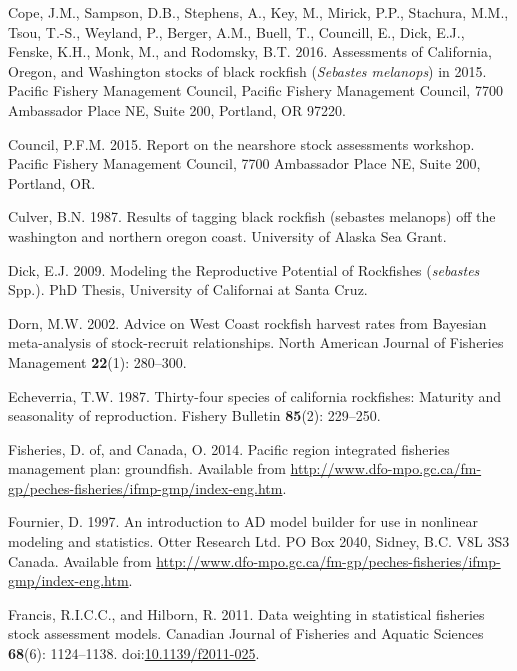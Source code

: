 \documentclass[11pt,
  english,
  letterpaper,
]{article}
\newlength{\cslhangindent}
\newenvironment{CSLReferences}[2] %
 {%
  \setlength{\parindent}{0pt}
  \ifodd #1 \everypar{\setlength{\hangindent}{\cslhangindent}}\ignorespaces\fi
  \ifnum #2 > 0
  \setlength{\parskip}{#2\baselineskip}
  \fi
 }%
 {}
\begin{document}
\begin{CSLReferences}{1}{0}
\leavevmode{}%
Cope, J.M., Sampson, D.B., Stephens, A., Key, M., Mirick, P.P., Stachura, M.M., Tsou, T.-S., Weyland, P., Berger, A.M., Buell, T., Councill, E., Dick, E.J., Fenske, K.H., Monk, M., and Rodomsky, B.T. 2016. Assessments of {California}, {Oregon}, and {Washington} stocks of black rockfish (\emph{{Sebastes} melanops}) in 2015. Pacific Fishery Management Council, Pacific Fishery Management Council, 7700 Ambassador Place NE, Suite 200, Portland, OR 97220.

\leavevmode{}%
Council, P.F.M. 2015. Report on the nearshore stock assessments workshop. Pacific Fishery Management Council, 7700 Ambassador Place NE, Suite 200, Portland, OR.

\leavevmode{}%
Culver, B.N. 1987. Results of tagging black rockfish (sebastes melanops) off the washington and northern oregon coast. University of Alaska Sea Grant.

\leavevmode{}%
Dick, E.J. 2009. Modeling the {Reproductive} {Potential} of {Rockfishes} (\emph{sebastes} {Spp}.). PhD Thesis, University of Californai at Santa Cruz.

\leavevmode{}%
Dorn, M.W. 2002. Advice on {West} {Coast} rockfish harvest rates from {B}ayesian meta-analysis of stock-recruit relationships. North American Journal of Fisheries Management \textbf{22}(1): 280--300.

\leavevmode{}%
Echeverria, T.W. 1987. Thirty-four species of california rockfishes: Maturity and seasonality of reproduction. Fishery Bulletin \textbf{85}(2): 229--250.

\leavevmode{}%
Fisheries, D. of, and Canada, O. 2014. Pacific region integrated fisheries management plan: groundfish. Available from \url{http://www.dfo-mpo.gc.ca/fm-gp/peches-fisheries/ifmp-gmp/index-eng.htm}.

\leavevmode{}%
Fournier, D. 1997. An introduction to AD model builder for use in nonlinear modeling and statistics. Otter Research Ltd. PO Box 2040, Sidney, B.C. V8L 3S3 Canada. Available from \url{http://www.dfo-mpo.gc.ca/fm-gp/peches-fisheries/ifmp-gmp/index-eng.htm}.

\leavevmode{}%
Francis, R.I.C.C., and Hilborn, R. 2011. Data weighting in statistical fisheries stock assessment models. Canadian Journal of Fisheries and Aquatic Sciences \textbf{68}(6): 1124--1138. doi:\href{https://doi.org/10.1139/f2011-025}{10.1139/f2011-025}.


\end{CSLReferences}
\end{document}

